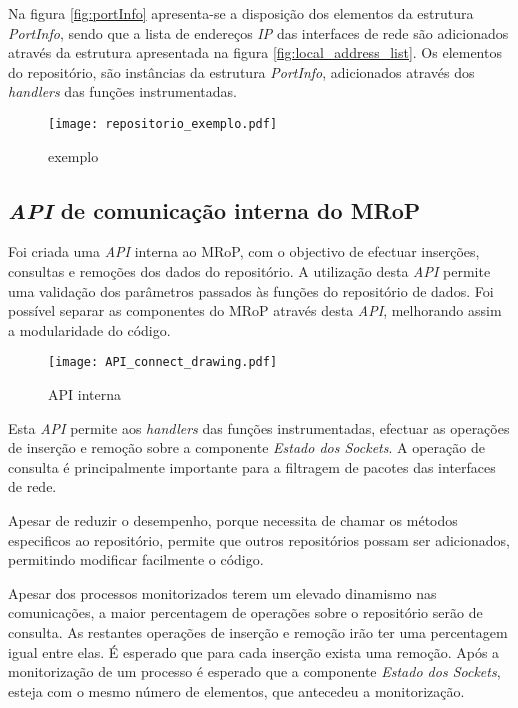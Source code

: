 Na figura \ref{fig:portInfo} apresenta-se a disposição dos elementos da estrutura \textit{PortInfo}, sendo que a lista de endereços \textit{IP} das interfaces de rede são adicionados através da estrutura apresentada na figura \ref{fig:local_address_list}.
Os elementos do repositório, são instâncias da estrutura \textit{PortInfo}, adicionados através dos \textit{handlers} das funções instrumentadas.

\begin{figure}[ht]
\centering
\texttt{[image: repositorio\_exemplo.pdf]}
\caption{exemplo}
\label{fig:repo_example}
\end{figure}

\subsection{\textit{API} de comunicação interna do MRoP}
\label{sub:repo_api}

Foi criada uma \textit{API} interna ao MRoP, com o objectivo de efectuar inserções, consultas e remoções dos dados do repositório.
A utilização desta \textit{API} permite uma validação dos parâmetros passados às funções do repositório de dados.
Foi possível separar as componentes do MRoP através desta \textit{API}, melhorando assim a modularidade do código.

\begin{figure}[ht]
\centering
\texttt{[image: API\_connect\_drawing.pdf]}
\caption{API interna}
\label{fig:api_connect}
\end{figure}

Esta \textit{API} permite aos \textit{handlers} das funções instrumentadas, efectuar as operações de inserção e remoção sobre a componente \textit{Estado dos Sockets}.
A operação de consulta é principalmente importante para a filtragem de pacotes das interfaces de rede.

Apesar de reduzir o desempenho, porque necessita de chamar os métodos especificos ao repositório, permite que outros repositórios possam ser adicionados, permitindo modificar facilmente o código.

Apesar dos processos monitorizados terem um elevado dinamismo nas comunicações, a maior percentagem de operações sobre o repositório serão de consulta.
As restantes operações de inserção e remoção irão ter uma percentagem igual entre elas.
É esperado que para cada inserção exista uma remoção.
Após a monitorização de um processo é esperado que a componente \textit{Estado dos Sockets}, esteja com o mesmo número de elementos, que antecedeu a monitorização.

